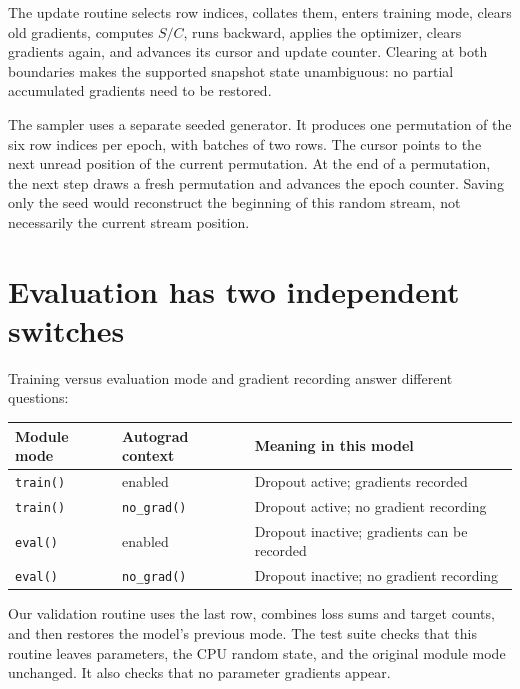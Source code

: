
The update routine selects row indices, collates them, enters training mode, clears old gradients, computes $S/C$, runs backward, applies the optimizer, clears gradients again, and advances its cursor and update counter. Clearing at both boundaries makes the supported snapshot state unambiguous: no partial accumulated gradients need to be restored.

The sampler uses a separate seeded generator. It produces one permutation of the six row indices per epoch, with batches of two rows. The cursor points to the next unread position of the current permutation. At the end of a permutation, the next step draws a fresh permutation and advances the epoch counter. Saving only the seed would reconstruct the beginning of this random stream, not necessarily the current stream position.

\section{Evaluation has two independent switches}

Training versus evaluation mode and gradient recording answer different questions:

\begin{center}\small
\begin{tabular}{lll}
\toprule Module mode & Autograd context & Meaning in this model\\\midrule
\texttt{train()} & enabled & Dropout active; gradients recorded\\
\texttt{train()} & \texttt{no\_grad()} & Dropout active; no gradient recording\\
\texttt{eval()} & enabled & Dropout inactive; gradients can be recorded\\
\texttt{eval()} & \texttt{no\_grad()} & Dropout inactive; no gradient recording\\\bottomrule
\end{tabular}
\end{center}

Our validation routine uses the last row, combines loss sums and target counts, and then restores the model's previous mode. The test suite checks that this routine leaves parameters, the CPU random state, and the original module mode unchanged. It also checks that no parameter gradients appear.

